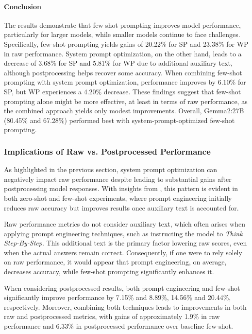 \paragraph{Conclusion}

The results demonstrate that few-shot prompting improves model performance, particularly for larger models, while smaller models continue to face challenges. Specifically, few-shot prompting yields gains of 20.22\% for \acf{SP} and 23.38\% for \acf{WP} in raw performance. System prompt optimization, on the other hand, leads to a decrease of 3.68\% for \ac{SP} and 5.81\% for \ac{WP} due to additional auxiliary text, although postprocessing helps recover some accuracy. When combining few-shot prompting with system prompt optimization, performance improves by 6.10\% for \ac{SP}, but \ac{WP} experiences a 4.20\% decrease. These findings suggest that few-shot prompting alone might be more effective, at least in terms of raw performance, as the combined approach yields only modest improvements. Overall, Gemma2:27B (80.45\% and 67.28\%) performed best with system-prompt-optimized few-shot prompting.

\subsubsection{Implications of Raw vs. Postprocessed Performance}
\label{par:raw-vs-post-performance}

As highlighted in the previous section, system prompt optimization can negatively impact raw performance despite leading to substantial gains after postprocessing model responses. With insights from , this pattern is evident in both zero-shot and few-shot experiments, where prompt engineering initially reduces raw accuracy but improves results once auxiliary text is accounted for.

Raw performance metrics do not consider auxiliary text, which often arises when applying prompt engineering techniques, such as instructing the model to \textit{Think Step-By-Step}. This additional text is the primary factor lowering raw scores, even when the actual answers remain correct. Consequently, if one were to rely solely on raw performance, it would appear that prompt engineering, on average, decreases accuracy, while few-shot prompting significantly enhances it.

When considering postprocessed results, both prompt engineering and few-shot significantly improve performance by 7.15\% and 8.89\%, 14.56\% and 20.44\%, respectively. Moreover, combining both techniques leads to improvements in both raw and postprocessed metrics, with gains of approximately 1.9\% in raw performance and 6.33\% in postprocessed performance over baseline few-shot.


